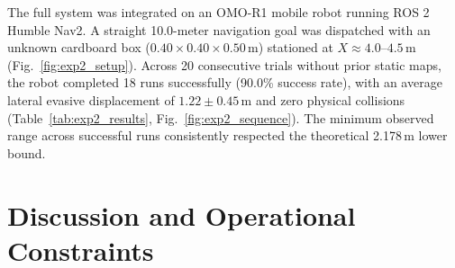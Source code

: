 \documentclass[12pt]{iopart}
\begin{document}
\begin{table}[!t]
  \centering
  \caption{Quantitative Results Across 20 Consecutive Real-World Obstacle Avoidance Trials}
  \label{tab:exp2_results}
\end{table}

The full system was integrated on an OMO-R1 mobile robot running ROS 2 Humble Nav2. A straight 10.0-meter navigation goal was dispatched with an unknown cardboard box ($0.40 \times 0.40 \times 0.50$\,m) stationed at $X \approx 4.0\text{--}4.5$\,m (Fig.~\ref{fig:exp2_setup}). Across 20 consecutive trials without prior static maps, the robot completed 18 runs successfully (90.0\% success rate), with an average lateral evasive displacement of $1.22 \pm 0.45$\,m and zero physical collisions (Table~\ref{tab:exp2_results}, Fig.~\ref{fig:exp2_sequence}). The minimum observed range across successful runs consistently respected the theoretical 2.178\,m lower bound.

\section{Discussion and Operational Constraints}
\label{sec:discussion}
\end{document}
